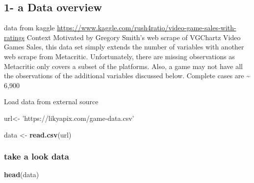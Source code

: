 \documentclass[]{article}
\newenvironment{Shaded}{\begin{snugshade}}{\end{snugshade}}
\newcommand{\DataTypeTok}[1]{\textcolor[rgb]{0.13,0.29,0.53}{#1}}
\newcommand{\KeywordTok}[1]{\textcolor[rgb]{0.13,0.29,0.53}{\textbf{#1}}}
\newcommand{\NormalTok}[1]{#1}
\newcommand{\OperatorTok}[1]{\textcolor[rgb]{0.81,0.36,0.00}{\textbf{#1}}}
\newcommand{\OtherTok}[1]{\textcolor[rgb]{0.56,0.35,0.01}{#1}}
\newcommand{\StringTok}[1]{\textcolor[rgb]{0.31,0.60,0.02}{#1}}
\begin{document}
\begin{Shaded}
\end{Shaded}

\hypertarget{a-data-overview}{%
\subsection{1- a Data overview}\label{a-data-overview}}

data from kaggle
\url{https://www.kaggle.com/rush4ratio/video-game-sales-with-ratings}
Context Motivated by Gregory Smith's web scrape of VGChartz Video Games
Sales, this data set simply extends the number of variables with another
web scrape from Metacritic. Unfortunately, there are missing
observations as Metacritic only covers a subset of the platforms. Also,
a game may not have all the observations of the additional variables
discussed below. Complete cases are \textasciitilde{} 6,900

Load data from external source

\begin{Shaded}
\begin{Highlighting}[]
\NormalTok{url<-}\StringTok{ 'https://likyapix.com/game-data.csv'}

\NormalTok{data <-}\StringTok{ }\KeywordTok{read.csv}\NormalTok{(url)}
\end{Highlighting}
\end{Shaded}

\hypertarget{take-a-look-data}{%
\subsubsection{take a look data}\label{take-a-look-data}}

\begin{Shaded}
\begin{Highlighting}[]
\KeywordTok{head}\NormalTok{(data)}
\end{Highlighting}
\end{Shaded}
\end{document}
